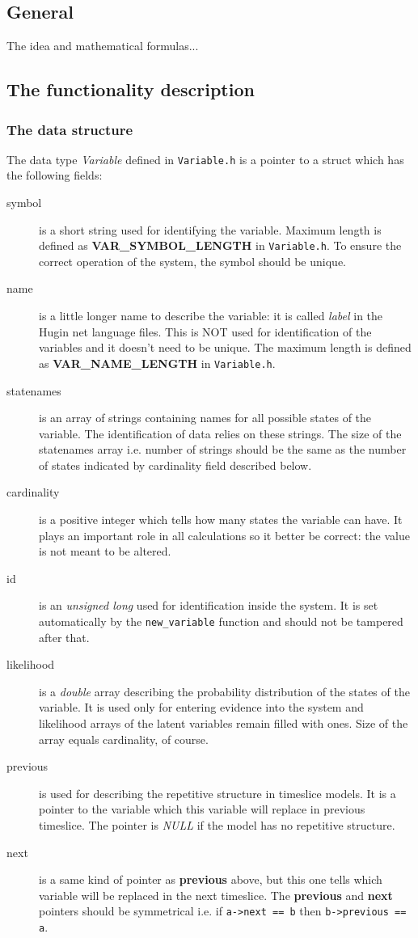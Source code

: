 \documentclass[12pt,a4paper]{report}
\newcommand{\cdefine}[1]{\textbf{#1}}
\begin{document}
\subsection{General}

The idea and mathematical formulas...

\subsection{The functionality description}

\subsubsection{The data structure}
The data type {\it Variable} defined in \verb+Variable.h+ is a pointer 
to a struct which has the following fields: 
\begin{description}
\item[symbol] is a short string used for identifying the variable. Maximum
length is defined as \cdefine{VAR\_SYMBOL\_LENGTH} in
\verb+Variable.h+. To ensure the correct operation of the system, the 
symbol should be unique.
\item[name] is a little longer name to describe the variable: it is
called {\it label} in the Hugin net language files. This is NOT used for 
identification of the variables and it doesn't need to be unique. 
The maximum length is defined as \textbf{VAR\_NAME\_LENGTH} in 
\verb+Variable.h+.
\item[statenames] is an array of strings containing names for all
possible states of the variable. The identification of data relies on
these strings. The size of the statenames array i.e. number of
strings should be the same as the number of states indicated by
cardinality field described below.
\item[cardinality] is a positive integer which tells how many states
the variable can have. It plays an important role in all calculations
so it better be correct: the value is not meant to be altered.
\item[id] is an {\it unsigned long} used for identification inside the
system. It is set automatically by the \verb+new_variable+ function
and should not be tampered after that.
\item[likelihood] is a {\it double} array describing the probability
distribution of the states of the variable. It is used only for
entering evidence into the system and likelihood arrays of the latent
variables remain filled with ones. Size of the array equals
cardinality, of course.
\item[previous] is used for describing the repetitive structure in
timeslice models. It is a pointer to the variable which this variable
will replace in previous timeslice. The pointer is {\it NULL} if the
model has no repetitive structure.
\item[next] is a same kind of pointer as \textbf{previous} above, but
this one tells which variable will be replaced in the next timeslice.
The \textbf{previous} and \textbf{next} pointers should be symmetrical
i.e. if \verb+a->next == b+ then \verb+b->previous == a+.
\end{description}
\end{document}
